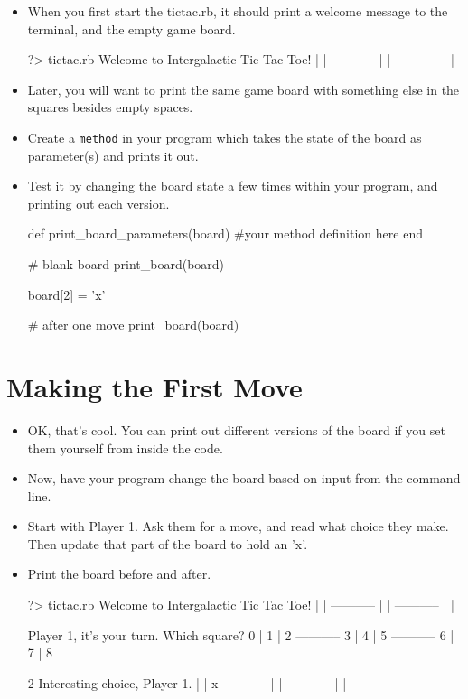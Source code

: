 \documentclass{42-en}
\begin{document}
\begin{itemize}

	\item When you first start the tictac.rb, it should print a welcome message to the terminal, and the empty game board.

	\begin{42console}
	?> tictac.rb
	Welcome to Intergalactic Tic Tac Toe!
	   |   |   
	-----------
	   |   |   
	-----------
	   |   |   
	\end{42console}

	\item Later, you will want to print the same game board with something else in the squares besides empty spaces.

	\item Create a \texttt{method} in your program which takes the state of the board as parameter(s) and prints it out.

	\item Test it by changing the board state a few times within your program, and printing out each version.

	\begin{42ccode}
	def print_board_parameters(board)
		#your method definition here
	end

	# blank board
	print_board(board)

	board[2] = 'x'

	# after one move
	print_board(board)
	\end{42ccode}

\end{itemize}

\chapter{Making the First Move}

\begin{itemize}

	\item OK, that's cool. You can print out different versions of the board if you set them yourself from inside the code.

	\item Now, have your program change the board based on input from the command line.

	\item Start with Player 1. Ask them for a move, and read what choice they make. Then update that part of the board to hold an 'x'. 

	\item Print the board before and after.
	
	\begin{42console}
	?> tictac.rb
	Welcome to Intergalactic Tic Tac Toe!
	   |   |   
	-----------
	   |   |   
	-----------
	   |   |   

	Player 1, it's your turn. Which square?
	 0 | 1 | 2 
	-----------
	 3 | 4 | 5 
	-----------
	 6 | 7 | 8 

	 2
	 Interesting choice, Player 1. 
	   |   | x 
	-----------
	   |   |   
	-----------
	   |   |   
	\end{42console}

\end{itemize}
\end{document}
